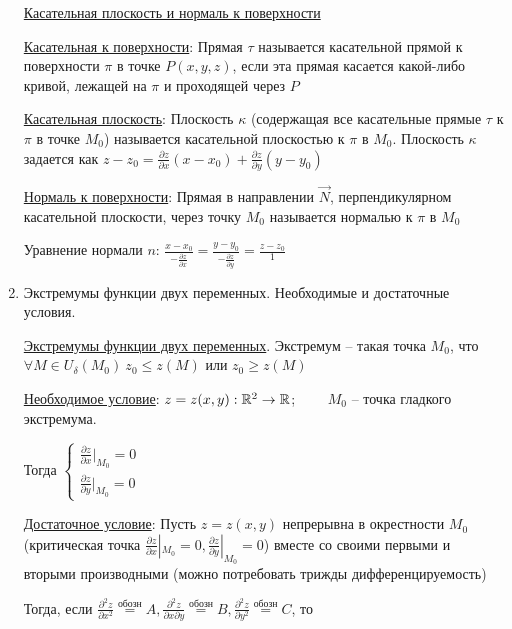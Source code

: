 \documentclass[12pt]{article}
\begin{document}
\begin{enumerate}
        \hyperlink{tangentandnormaltosurface}{Касательная плоскость и нормаль к поверхности}

        \hyperlink{tangenttosurface}{Касательная к поверхности}: Прямая $\tau$ называется касательной прямой к поверхности $\pi$ в точке $P(x, y, z)$,
        если эта прямая касается какой-либо кривой, лежащей на $\pi$ и проходящей через $P$

        \hyperlink{tangentplanetosurface}{Касательная плоскость}: Плоскость $\kappa$ (содержащая все касательные прямые $\tau$ к $\pi$ в точке $M_0$) называется касательной плоскостью к $\pi$ в $M_0$. Плоскость $\kappa$ задается как $z - z_0 = \frac{\partial z}{\partial x}(x - x_0) + \frac{\partial z}{\partial y} (y - y_0)$

        \hyperlink{normaltosurface}{Нормаль к поверхности}: Прямая в направлении $\overrightarrow{N}$, перпендикулярном касательной плоскости, через точку $M_0$ называется нормалью к $\pi$ в $M_0$

        Уравнение нормали $n$: $\frac{x - x_0}{-\frac{\partial z}{\partial x}} = \frac{y - y_0}{-\frac{\partial z}{\partial y}} = \frac{z - z_0}{1}$


        \item Экстремумы функции двух переменных. Необходимые и достаточные условия.

        \hyperlink{extremumsoffunctions}{Экстремумы функции двух переменных}.
        Экстремум -- такая точка $M_0$, что $\forall M \in U_\delta(M_0) \ z_0 \leq z(M)$ или $z_0 \geq z(M)$

        \hyperlink{extremumnecessarycondition}{Необходимое условие}: $z = z(x, y) : \mathbb{R}^2 \rightarrow \mathbb{R}$; $\quad\quad M_0$ -- точка гладкого экстремума.

        Тогда $\begin{cases}\frac{\partial z}{\partial x} |_{M_0} = 0 \\ \frac{\partial z}{\partial y} |_{M_0} = 0\end{cases}$

        \hyperlink{extremumsufficientcondition}{Достаточное условие}: Пусть $z = z(x, y)$ непрерывна в окрестности $M_0$ (критическая точка $\frac{\partial z}{\partial x} |_{M_0} = 0, \frac{\partial z}{\partial y} |_{M_0} = 0$)
        вместе со своими первыми и вторыми производными (можно потребовать трижды дифференцируемость)

        Тогда, если $\frac{\partial^2 z}{\partial x^2} \stackrel{\text{обозн}}{=} A, \frac{\partial^2 z}{\partial x \partial y} \stackrel{\text{обозн}}{=} B, \frac{\partial^2 z}{\partial y^2} \stackrel{\text{обозн}}{=} C$, то


\end{enumerate}
\end{document}
